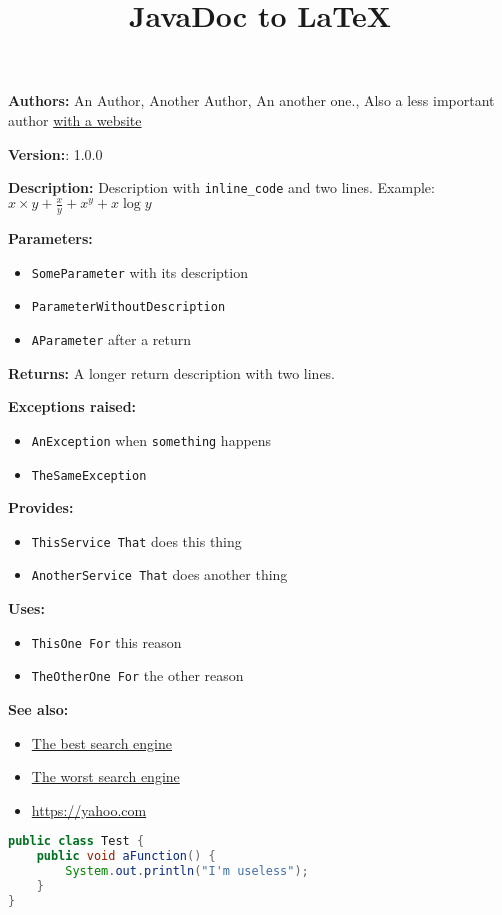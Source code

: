 \documentclass{article}
\title{JavaDoc to LaTeX}
\begin{document}
\textbf{Authors:} An Author,  Another Author,  An another one., Also a less important author \href{https://website.net}{with a website} 


\textbf{Version:}: 1.0.0 

\textbf{Description:}
 Description with \texttt{inline\_code} and two lines. Example: $x\times y + \frac{x}{y} + x^y + x\log y$  

\textbf{Parameters:}
\begin{itemize}
  \item\texttt{SomeParameter} with its description 
  \item\texttt{ParameterWithoutDescription}
  \item\texttt{AParameter} 		after a return 
\end{itemize}

\textbf{Returns:}
A longer return description with two lines. 

\textbf{Exceptions raised:}
\begin{itemize}
  \item\texttt{AnException} when \texttt{something} happens 
  \item\texttt{TheSameException}  
\end{itemize}

\textbf{Provides:}
\begin{itemize}
  \item\texttt{ThisService		That} does this thing
  \item\texttt{AnotherService	That} does another thing
\end{itemize}

\textbf{Uses:}
\begin{itemize}
  \item\texttt{ThisOne			For} this reason
  \item\texttt{TheOtherOne		For} the other reason
\end{itemize}

\textbf{See also:}
\begin{itemize}
  \item\href{https://google.com}{The best search engine}
  \item\href{https://bing.com}{The worst search engine}
  \item\href{https://yahoo.com}{https://yahoo.com}
\end{itemize}

\begin{lstlisting}[language=Java]
public class Test {
	public void aFunction() {
		System.out.println("I'm useless");
	}
}
\end{lstlisting}
\end{document}
